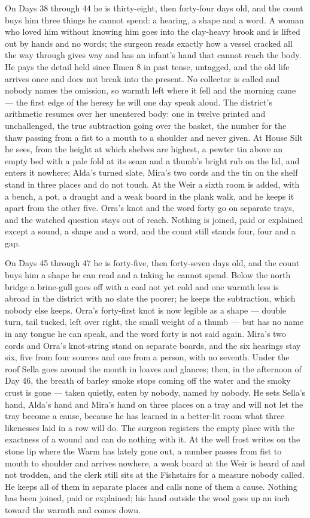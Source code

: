 \documentclass{design/chronicle}
\begin{document}
{On Days 38 through 44 he is thirty-eight, then forty-four days old, and the count buys him three things he cannot spend: a hearing, a shape and a word. A woman who loved him without knowing him goes into the clay-heavy brook and is lifted out by hands and no words; the surgeon reads exactly how a vessel cracked all the way through gives way and has an infant’s hand that cannot reach the body. He pays the detail held since Ilmen 8 in past tense, untagged, and the old life arrives once and does not break into the present. No collector is called and nobody names the omission, so warmth left where it fell and the morning came --- the first edge of the heresy he will one day speak aloud. The district’s arithmetic resumes over her unentered body: one in twelve printed and unchallenged, the true subtraction going over the basket, the number for the thaw passing from a fist to a mouth to a shoulder and never given. At House Silt he sees, from the height at which shelves are highest, a pewter tin above an empty bed with a pale fold at its seam and a thumb’s bright rub on the lid, and enters it nowhere; Alda’s turned slate, Mira’s two cords and the tin on the shelf stand in three places and do not touch. At the Weir a sixth room is added, with a bench, a pot, a draught and a weak board in the plank walk, and he keeps it apart from the other five. Orra’s knot and the word forty go on separate trays, and the watched question stays out of reach. Nothing is joined, paid or explained except a sound, a shape and a word, and the count still stands four, four and a gap.

On Days 45 through 47 he is forty-five, then forty-seven days old, and the count buys him a shape he can read and a taking he cannot spend. Below the north bridge a brine-gull goes off with a coal not yet cold and one warmth less is abroad in the district with no slate the poorer; he keeps the subtraction, which nobody else keeps. Orra’s forty-first knot is now legible as a shape --- double turn, tail tucked, left over right, the small weight of a thumb --- but has no name in any tongue he can speak, and the word forty is not said again. Mira’s two cords and Orra’s knot-string stand on separate boards, and the six hearings stay six, five from four sources and one from a person, with no seventh. Under the roof Sella goes around the month in loaves and glances; then, in the afternoon of Day 46, the breath of barley smoke stops coming off the water and the smoky crust is gone --- taken quietly, eaten by nobody, named by nobody. He sets Sella’s hand, Alda’s hand and Mira’s hand on three places on a tray and will not let the tray become a cause, because he has learned in a better-lit room what three likenesses laid in a row will do. The surgeon registers the empty place with the exactness of a wound and can do nothing with it. At the well frost writes on the stone lip where the Warm has lately gone out, a number passes from fist to mouth to shoulder and arrives nowhere, a weak board at the Weir is heard of and not trodden, and the clerk still sits at the Fishstairs for a measure nobody called. He keeps all of them in separate places and calls none of them a cause. Nothing has been joined, paid or explained; his hand outside the wool goes up an inch toward the warmth and comes down.

}
\end{document}
